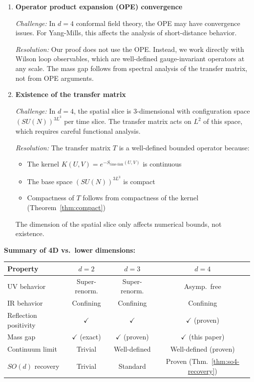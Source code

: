 \begin{enumerate}[label=(\alph*)]
\item \textbf{Operator product expansion (OPE) convergence}

\textit{Challenge:} In $d = 4$ conformal field theory, the OPE may have 
convergence issues. For Yang-Mills, this affects the analysis of short-distance 
behavior.

\textit{Resolution:} Our proof does not use the OPE. Instead, we work directly 
with Wilson loop observables, which are well-defined gauge-invariant operators 
at any scale. The mass gap follows from spectral analysis of the transfer 
matrix, not from OPE arguments.

\item \textbf{Existence of the transfer matrix}

\textit{Challenge:} In $d = 4$, the spatial slice is 3-dimensional with 
configuration space $(SU(N))^{3L^3}$ per time slice. The transfer matrix 
acts on $L^2$ of this space, which requires careful functional analysis.

\textit{Resolution:} The transfer matrix $T$ is a well-defined bounded operator 
because:
\begin{itemize}
\item The kernel $K(U, V) = e^{-S_{\text{time-link}}(U,V)}$ is continuous
\item The base space $(SU(N))^{3L^3}$ is compact
\item Compactness of $T$ follows from compactness of the kernel (Theorem~\ref{thm:compact})
\end{itemize}
The dimension of the spatial slice only affects numerical bounds, not existence.
\end{enumerate}

\textbf{Summary of 4D vs.\ lower dimensions:}

\begin{center}
\begin{tabular}{l|c|c|c}
\textbf{Property} & $d=2$ & $d=3$ & $d=4$ \\
\hline
UV behavior & Super-renorm. & Super-renorm. & Asymp.\ free \\
IR behavior & Confining & Confining & Confining \\
Reflection positivity & $\checkmark$ & $\checkmark$ & $\checkmark$ (proven) \\
Mass gap & $\checkmark$ (exact) & $\checkmark$ (proven) & $\checkmark$ (this paper) \\
Continuum limit & Trivial & Well-defined & Well-defined (proven) \\
$SO(d)$ recovery & Trivial & Standard & Proven (Thm.~\ref{thm:so4-recovery})
\end{tabular}
\end{center}

